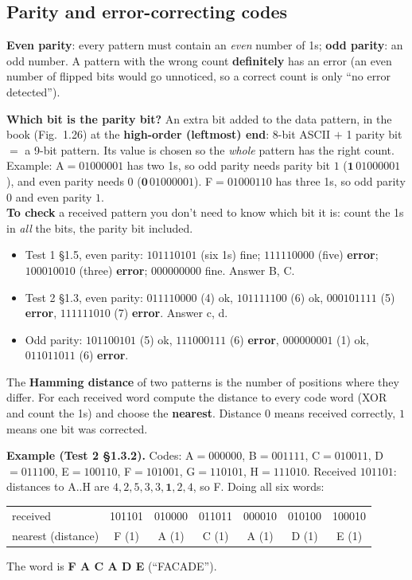 \documentclass{fkt-notes}
\begin{document}
\subsection{Parity and error-correcting codes}
\begin{rulebox}[title={Parity}]
  \textbf{Even parity}: every pattern must contain an \emph{even} number of 1s;
  \textbf{odd parity}: an odd number. A pattern with the wrong count
  \textbf{definitely} has an error (an even number of flipped bits would go unnoticed,
  so a correct count is only ``no error detected'').

  \textbf{Which bit is the parity bit?} An extra bit added to the data
  pattern, in the book (Fig.~1.26) at the \textbf{high-order (leftmost) end}:
  8-bit ASCII $+$ 1 parity bit $=$ a 9-bit pattern. Its value is chosen so
  the \emph{whole} pattern has the right count. Example: A$=01000001$ has two
  1s, so odd parity needs parity bit $1$ ($\mathbf{1}\,01000001$), and even
  parity needs $0$ ($\mathbf{0}\,01000001$). F$=01000110$ has three 1s, so
  odd parity $0$ and even parity $1$.\\
  \textbf{To check} a received pattern you don't need to know which bit it
  is: count the 1s in \emph{all} the bits, the parity bit included.
\end{rulebox}
\begin{itemize}[nosep]
  \item Test 1 \S1.5, even parity: $101110101$ (six 1s) fine; $111110000$ (five) \textbf{error};
        $100010010$ (three) \textbf{error}; $000000000$ fine. Answer B, C.
  \item Test 2 \S1.3, even parity: $011110000$ (4) ok, $101111100$ (6) ok, $000101111$ (5) \textbf{error},
        $111111010$ (7) \textbf{error}. Answer c, d.
  \item Odd parity: $101100101$ (5) ok, $111000111$ (6) \textbf{error}, $000000001$ (1) ok,
        $011011011$ (6) \textbf{error}.
\end{itemize}

\begin{rulebox}[title={Method: decoding with an error-correcting code (Hamming distance)}]
  The \textbf{Hamming distance} of two patterns is the number of positions where
  they differ. For each received word compute the distance to every code word
  (XOR and count the 1s) and choose the \textbf{nearest}. Distance $0$ means received
  correctly, $1$ means one bit was corrected.
\end{rulebox}
\textbf{Example (Test 2 \S1.3.2).} Codes: A$=000000$, B$=001111$, C$=010011$, D$=011100$,
E$=100110$, F$=101001$, G$=110101$, H$=111010$. Received $101101$: distances to
A..H are $4,2,5,3,3,\mathbf1,2,4$, so F. Doing all six words:
\begin{center}
  \small
  \begin{tabular}{@{}lcccccc@{}}
    received           & 101101 & 010000 & 011011 & 000010 & 010100 & 100010 \\
    nearest (distance) & F (1)  & A (1)  & C (1)  & A (1)  & D (1)  & E (1)  \\
  \end{tabular}
\end{center}
The word is \textbf{F A C A D E} (``FACADE'').
\end{document}
